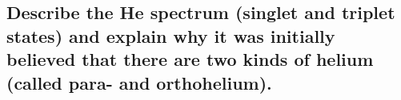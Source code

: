 \subsection{Describe the He spectrum (singlet and triplet states) and explain why it was initially believed that there are two kinds of helium (called para- and orthohelium).}


